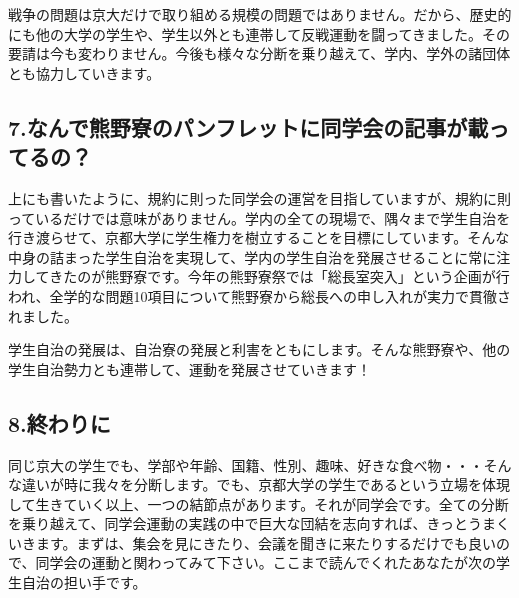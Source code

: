 戦争の問題は京大だけで取り組める規模の問題ではありません。だから、歴史的にも他の大学の学生や、学生以外とも連帯して反戦運動を闘ってきました。その要請は今も変わりません。今後も様々な分断を乗り越えて、学内、学外の諸団体とも協力していきます。

\subsection{7.なんで熊野寮のパンフレットに同学会の記事が載ってるの？}

上にも書いたように、規約に則った同学会の運営を目指していますが、規約に則っているだけでは意味がありません。学内の全ての現場で、隅々まで学生自治を行き渡らせて、京都大学に学生権力を樹立することを目標にしています。そんな中身の詰まった学生自治を実現して、学内の学生自治を発展させることに常に注力してきたのが熊野寮です。今年の熊野寮祭では「総長室突入」という企画が行われ、全学的な問題10項目について熊野寮から総長への申し入れが実力で貫徹されました。

学生自治の発展は、自治寮の発展と利害をともにします。そんな熊野寮や、他の学生自治勢力とも連帯して、運動を発展させていきます！

\subsection{8.終わりに}
同じ京大の学生でも、学部や年齢、国籍、性別、趣味、好きな食べ物・・・そんな違いが時に我々を分断します。でも、京都大学の学生であるという立場を体現して生きていく以上、一つの結節点があります。それが同学会です。全ての分断を乗り越えて、同学会運動の実践の中で巨大な団結を志向すれば、きっとうまくいきます。まずは、集会を見にきたり、会議を聞きに来たりするだけでも良いので、同学会の運動と関わってみて下さい。ここまで読んでくれたあなたが次の学生自治の担い手です。

\subsecdefault
